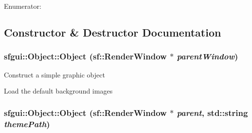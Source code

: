 \begin{Desc}
\item[Enumerator: ]\par
\begin{description}
\item[{\em 
\hypertarget{classsfgui_1_1Object_8a7d7ae20a88b7ef8a104f7e6c8596cee8211d79a1f35d08db2b31a914bddc38}{
BackgroundNormal}
\label{classsfgui_1_1Object_8a7d7ae20a88b7ef8a104f7e6c8596cee8211d79a1f35d08db2b31a914bddc38}
}]\item[{\em 
\hypertarget{classsfgui_1_1Object_8a7d7ae20a88b7ef8a104f7e6c8596ce03b529b6f0fee7ab7cc0033441180b67}{
BackgroundClicked}
\label{classsfgui_1_1Object_8a7d7ae20a88b7ef8a104f7e6c8596ce03b529b6f0fee7ab7cc0033441180b67}
}]\item[{\em 
\hypertarget{classsfgui_1_1Object_8a7d7ae20a88b7ef8a104f7e6c8596ce9befc9dbae9107e3e7546af33a139df9}{
BackgroundHover}
\label{classsfgui_1_1Object_8a7d7ae20a88b7ef8a104f7e6c8596ce9befc9dbae9107e3e7546af33a139df9}
}]\end{description}
\end{Desc}



\subsection{Constructor \& Destructor Documentation}
\hypertarget{classsfgui_1_1Object_f03d0a10a3f8f71c58f56cf896e95f82}{
\subsubsection[Object]{\setlength{\rightskip}{0pt plus 5cm}sfgui::Object::Object (sf::RenderWindow $\ast$ {\em parentWindow})}}
\label{classsfgui_1_1Object_f03d0a10a3f8f71c58f56cf896e95f82}




Construct a simple graphic object

Load the default background images \hypertarget{classsfgui_1_1Object_6d0f96eda1f89ba15d34471cfa42a0e4}{
\subsubsection[Object]{\setlength{\rightskip}{0pt plus 5cm}sfgui::Object::Object (sf::RenderWindow $\ast$ {\em parent}, \/  std::string {\em themePath})}}
\label{classsfgui_1_1Object_6d0f96eda1f89ba15d34471cfa42a0e4}




